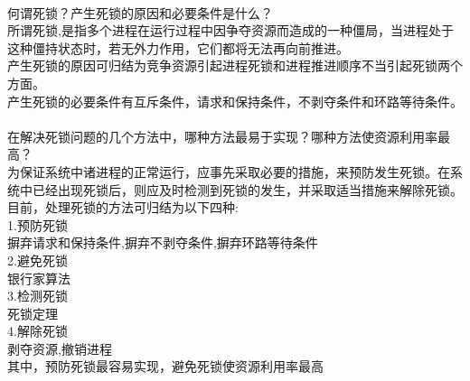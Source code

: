 \documentclass[UTF8]{article}
\begin{document}
    \\
    何谓死锁？产生死锁的原因和必要条件是什么？\\
    所谓死锁,是指多个进程在运行过程中因争夺资源而造成的一种僵局，当进程处于这种僵持状态时，若无外力作用，它们都将无法再向前推进。\\
    产生死锁的原因可归结为竞争资源引起进程死锁和进程推进顺序不当引起死锁两个方面。\\
    产生死锁的必要条件有互斥条件，请求和保持条件，不剥夺条件和环路等待条件。 \\
    \\
    在解决死锁问题的几个方法中，哪种方法最易于实现？哪种方法使资源利用率最高？\\
    为保证系统中诸进程的正常运行，应事先采取必要的措施，来预防发生死锁。在系统中已经出现死锁后，则应及时检测到死锁的发生，并采取适当措施来解除死锁。目前，处理死锁的方法可归结为以下四种:\\
    1.预防死锁\\
    摒弃请求和保持条件,摒弃不剥夺条件,摒弃环路等待条件\\
    2.避免死锁\\
    银行家算法\\
    3.检测死锁\\
    死锁定理\\
    4.解除死锁\\
    剥夺资源,撤销进程\\
    其中，预防死锁最容易实现，避免死锁使资源利用率最高
\end{document}
